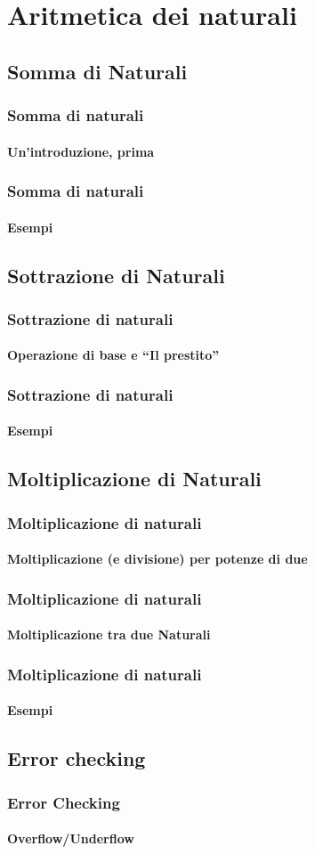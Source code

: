 \documentclass{beamer}
\begin{document}
  \section[Operations]{Aritmetica dei naturali}
	\subsection[NatSum]{Somma di Naturali}  
	  \begin{frame}
	    \frametitle{Somma di naturali}
	    \framesubtitle{Un'introduzione, prima}
	  \end{frame}
	  \begin{frame}
	    \frametitle{Somma di naturali}
	    \framesubtitle{Esempi}
	  \end{frame}
  \subsection[NatSub]{Sottrazione di Naturali}  
	  \begin{frame}
	    \frametitle{Sottrazione di naturali}
	    \framesubtitle{Operazione di base e ``Il prestito''}
	  \end{frame}
	  \begin{frame}
	    \frametitle{Sottrazione di naturali}
	    \framesubtitle{Esempi}
	  \end{frame}
	\subsection[NatMul]{Moltiplicazione di Naturali}  
	  \begin{frame}
	    \frametitle{Moltiplicazione di naturali}
	    \framesubtitle{Moltiplicazione (e divisione) per potenze di due}
	  \end{frame}
	  \begin{frame}
	    \frametitle{Moltiplicazione di naturali}
	    \framesubtitle{Moltiplicazione tra due Naturali}
	  \end{frame}
		\begin{frame}
	    \frametitle{Moltiplicazione di naturali}
	    \framesubtitle{Esempi}
	  \end{frame}
	\subsection[Errors]{Error checking}
		\begin{frame}
	    \frametitle{Error Checking}
	    \framesubtitle{Overflow/Underflow}
	  \end{frame}
  
\end{document}
